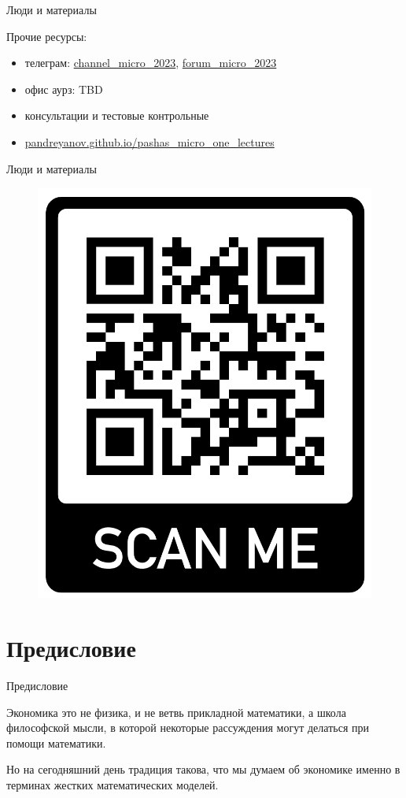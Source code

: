 \documentclass{beamer}
\begin{document}
\begin{frame}{Люди и материалы}

Прочие ресурсы:
\begin{itemize}
\item телеграм: \url{channel_micro_2023}, \url{forum_micro_2023}
\item офис аурз: TBD
\item консультации и тестовые контрольные
\item \url{pandreyanov.github.io/pashas_micro_one_lectures}
\end{itemize}

\end{frame}

\begin{frame}{Люди и материалы}

\begin{figure}[hbt]
\centering
\includegraphics[width=.6 \textwidth]{qrcode}
\end{figure}

\end{frame}

\section{Предисловие}

\begin{frame}{Предисловие}

Экономика это не физика, и не ветвь прикладной математики, а школа философской мысли, в которой некоторые рассуждения могут делаться при помощи математики. 

Но на сегодняшний день традиция такова, что мы думаем об экономике именно в терминах жестких математических моделей. 

\end{frame}
\end{document}
